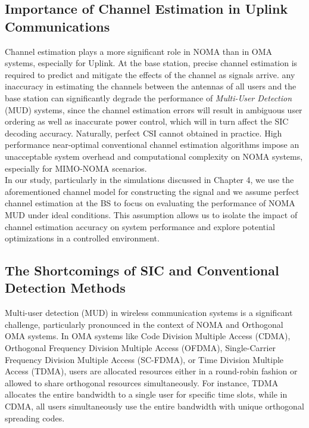 \subsection*{Importance of Channel Estimation in Uplink Communications}
Channel estimation plays a more significant role in NOMA than in OMA systems, especially for Uplink.  At the base station, precise channel estimation is required to predict and mitigate the effects of the channel as signals arrive. any inaccuracy in estimating the channels between the antennas of all users and the base station can significantly degrade the performance of \textit{Multi-User Detection} (MUD) systems, since the channel estimation errors will result in ambiguous user ordering as well as inaccurate power control, which will in turn affect the SIC decoding accuracy. Naturally, perfect CSI cannot obtained in practice. High
performance near-optimal conventional channel estimation algorithms impose an unacceptable system
overhead and computational complexity on NOMA systems, especially for MIMO-NOMA scenarios. 
\\In our study, particularly in the simulations discussed in Chapter 4, we use the aforementioned channel model for constructing the signal and we assume perfect channel estimation at the BS to focus on evaluating the performance of NOMA MUD under ideal conditions. This assumption allows us to isolate the impact of channel estimation accuracy on system performance and explore potential optimizations in a controlled environment.


\subsection{The Shortcomings of SIC and Conventional Detection Methods}
Multi-user detection (MUD) in wireless communication systems is a significant challenge, particularly pronounced in the context of NOMA and Orthogonal OMA systems. In OMA systems like Code Division Multiple Access (CDMA), Orthogonal Frequency Division Multiple Access (OFDMA), Single-Carrier Frequency Division Multiple Access (SC-FDMA), or Time Division Multiple Access (TDMA), users are allocated resources either in a round-robin fashion or allowed to share orthogonal resources simultaneously. For instance, TDMA allocates the entire bandwidth to a single user for specific time slots, while in CDMA, all users simultaneously use the entire bandwidth with unique orthogonal spreading codes.

